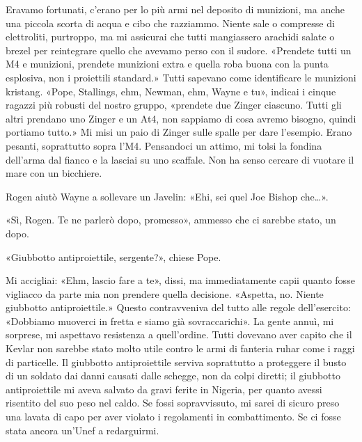 Eravamo fortunati, c'erano per lo più armi nel deposito di munizioni, ma
anche una piccola scorta di acqua e cibo che razziammo. Niente sale o
compresse di elettroliti, purtroppo, ma mi assicurai che tutti
mangiassero arachidi salate o brezel per reintegrare quello che avevamo
perso con il sudore. «Prendete tutti un M4 e munizioni, prendete
munizioni extra e quella roba buona con la punta esplosiva, non i
proiettili standard.» Tutti sapevano come identificare le munizioni
kristang. «Pope, Stallings, ehm, Newman, ehm, Wayne e tu», indicai i
cinque ragazzi più robusti del nostro gruppo, «prendete due Zinger
ciascuno. Tutti gli altri prendano uno Zinger e un At4, non sappiamo di
cosa avremo bisogno, quindi portiamo tutto.» Mi misi un paio di Zinger
sulle spalle per dare l'esempio. Erano pesanti, soprattutto sopra l'M4.
Pensandoci un attimo, mi tolsi la fondina dell'arma dal fianco e la
lasciai su uno scaffale. Non ha senso cercare di vuotare il mare con un
bicchiere.

Rogen aiutò Wayne a sollevare un Javelin: «Ehi, sei quel Joe Bishop
che\ldots».

«Sì, Rogen. Te ne parlerò dopo, promesso», ammesso che ci sarebbe stato,
un dopo.

«Giubbotto antiproiettile, sergente?», chiese Pope.

Mi accigliai: «Ehm, lascio fare a te», dissi, ma immediatamente capii
quanto fosse vigliacco da parte mia non prendere quella decisione.
«Aspetta, no. Niente giubbotto antiproiettile.» Questo contravveniva del
tutto alle regole dell'esercito: «Dobbiamo muoverci in fretta e siamo
già sovraccarichi». La gente annuì, mi sorprese, mi aspettavo resistenza
a quell'ordine. Tutti dovevano aver capito che il Kevlar non sarebbe
stato molto utile contro le armi di fanteria ruhar come i raggi di
particelle. Il giubbotto antiproiettile serviva soprattutto a proteggere
il busto di un soldato dai danni causati dalle schegge, non da colpi
diretti; il giubbotto antiproiettile mi aveva salvato da gravi ferite in
Nigeria, per quanto avessi risentito del suo peso nel caldo. Se fossi
sopravvissuto, mi sarei di sicuro preso una lavata di capo per aver
violato i regolamenti in combattimento. Se ci fosse stata ancora un'Unef
a redarguirmi.

